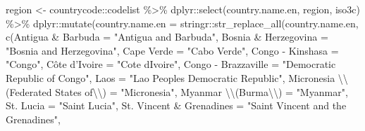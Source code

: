 \documentclass[
  12pt,
]{article}
\newenvironment{Shaded}{}{}
\newcommand{\AttributeTok}[1]{\textcolor[rgb]{0.49,0.56,0.16}{#1}}
\newcommand{\FunctionTok}[1]{\textcolor[rgb]{0.02,0.16,0.49}{#1}}
\newcommand{\NormalTok}[1]{#1}
\newcommand{\OtherTok}[1]{\textcolor[rgb]{0.00,0.44,0.13}{#1}}
\newcommand{\SpecialCharTok}[1]{\textcolor[rgb]{0.25,0.44,0.63}{#1}}
\newcommand{\StringTok}[1]{\textcolor[rgb]{0.25,0.44,0.63}{#1}}
\begin{document}
\begin{Shaded}
\begin{Highlighting}[]
\NormalTok{region }\OtherTok{\textless{}{-}}\NormalTok{ countrycode}\SpecialCharTok{::}\NormalTok{codelist }\SpecialCharTok{\%\textgreater{}\%}
\NormalTok{    dplyr}\SpecialCharTok{::}\FunctionTok{select}\NormalTok{(country.name.en, region, }
\NormalTok{        iso3c) }\SpecialCharTok{\%\textgreater{}\%}
\NormalTok{    dplyr}\SpecialCharTok{::}\FunctionTok{mutate}\NormalTok{(}\AttributeTok{country.name.en =}\NormalTok{ stringr}\SpecialCharTok{::}\FunctionTok{str\_replace\_all}\NormalTok{(country.name.en, }
        \FunctionTok{c}\NormalTok{(}\StringTok{\textasciigrave{}}\AttributeTok{Antigua \& Barbuda}\StringTok{\textasciigrave{}} \OtherTok{=} \StringTok{"Antigua and Barbuda"}\NormalTok{, }
            \StringTok{\textasciigrave{}}\AttributeTok{Bosnia \& Herzegovina}\StringTok{\textasciigrave{}} \OtherTok{=} \StringTok{"Bosnia and Herzegovina"}\NormalTok{, }
            \StringTok{\textasciigrave{}}\AttributeTok{Cape Verde}\StringTok{\textasciigrave{}} \OtherTok{=} \StringTok{"Cabo Verde"}\NormalTok{, }
            \StringTok{\textasciigrave{}}\AttributeTok{Congo {-} Kinshasa}\StringTok{\textasciigrave{}} \OtherTok{=} \StringTok{"Congo"}\NormalTok{, }
            \StringTok{\textasciigrave{}}\AttributeTok{Côte d’Ivoire}\StringTok{\textasciigrave{}} \OtherTok{=} \StringTok{"Cote d\textquotesingle{}Ivoire"}\NormalTok{, }
            \StringTok{\textasciigrave{}}\AttributeTok{Congo {-} Brazzaville}\StringTok{\textasciigrave{}} \OtherTok{=} \StringTok{"Democratic Republic of Congo"}\NormalTok{, }
            \AttributeTok{Laos =} \StringTok{"Lao People\textquotesingle{}s Democratic Republic"}\NormalTok{, }
            \StringTok{\textasciigrave{}}\AttributeTok{Micronesia }\SpecialCharTok{\textbackslash{}\textbackslash{}}\AttributeTok{(Federated States of}\SpecialCharTok{\textbackslash{}\textbackslash{}}\AttributeTok{)}\StringTok{\textasciigrave{}} \OtherTok{=} \StringTok{"Micronesia"}\NormalTok{, }
            \StringTok{\textasciigrave{}}\AttributeTok{Myanmar }\SpecialCharTok{\textbackslash{}\textbackslash{}}\AttributeTok{(Burma}\SpecialCharTok{\textbackslash{}\textbackslash{}}\AttributeTok{)}\StringTok{\textasciigrave{}} \OtherTok{=} \StringTok{"Myanmar"}\NormalTok{, }
            \StringTok{\textasciigrave{}}\AttributeTok{St. Lucia}\StringTok{\textasciigrave{}} \OtherTok{=} \StringTok{"Saint Lucia"}\NormalTok{, }
            \StringTok{\textasciigrave{}}\AttributeTok{St. Vincent \& Grenadines}\StringTok{\textasciigrave{}} \OtherTok{=} \StringTok{"Saint Vincent and the Grenadines"}\NormalTok{, }

\end{Highlighting}
\end{Shaded}
\end{document}
